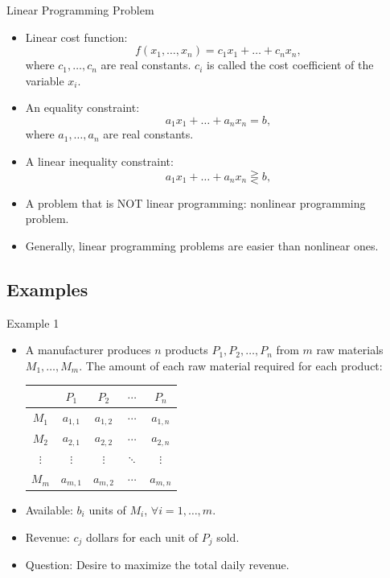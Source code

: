 \documentclass[aspectratio=169,hyperref,UTF8,CJK]{beamer}
\begin{document}
\begin{frame}{Linear Programming Problem}
  \footnotesize
  \begin{itemize}
    \item Linear cost function:
      \begin{equation}\tag{3}
        f(x_1,\ldots,x_n)=c_1x_1+\ldots+c_nx_n,
      \end{equation}
      where $c_1,\ldots,c_n$ are real constants. $c_i$ is called the cost coefficient of the variable $x_i$.
    \item An equality constraint:
      \begin{equation}\tag{4}
        a_1x_1+\ldots+a_nx_n=b,
      \end{equation}
      where $a_1,\ldots,a_n$ are real constants.
    \item A linear inequality constraint:
      \begin{equation}\tag{5}
        a_1x_1+\ldots+a_nx_n\gtreqless b,
      \end{equation}
    \item A problem that is NOT linear programming: nonlinear programming problem.
    \item Generally, linear programming problems are easier than nonlinear ones.
  \end{itemize}
\end{frame}

\subsection{Examples}

\begin{frame}{Example 1}
  \small
  \begin{itemize}
    \item A manufacturer produces $n$ products $P_1,P_2,\ldots,P_n$ from $m$ raw materials $M_1,\ldots,M_m$. The amount of each raw material required for each product:
      \begin{center}
        \begin{tabular}{c|cccc}
          & $P_1$ & $P_2$ & $\cdots$ & $P_n$\\ \hline
          $M_1$ & $a_{1,1}$ & $a_{1,2}$ & $\cdots$ & $a_{1,n}$\\
          $M_2$ & $a_{2,1}$ & $a_{2,2}$ & $\cdots$ & $a_{2,n}$\\
          $\vdots$ & $\vdots$ & $\vdots$ & $\ddots$ & $\vdots$\\
          $M_m$ & $a_{m,1}$ & $a_{m,2}$ & $\cdots$ & $a_{m,n}$
        \end{tabular}
      \end{center}
    \item Available: $b_i$ units of $M_i$, $\forall i=1,\ldots,m$.
    \item Revenue: $c_j$ dollars for each unit of $P_j$ sold.
    \item Question: Desire to maximize the total daily revenue.
  \end{itemize}
\end{frame}
\end{document}
